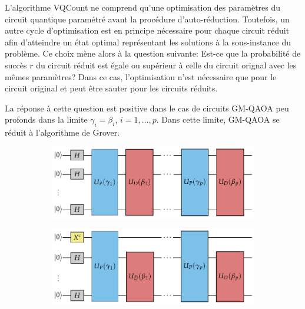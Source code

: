 L'algorithme VQCount ne comprend qu'une optimisation des paramètres du circuit quantique paramétré avant la procédure d'auto-réduction. Toutefois, un autre cycle d'optimisation est en principe nécessaire pour chaque circuit réduit afin d'atteindre un état optimal représentant les solutions à la sous-instance du problème. Ce choix mène alors à la question suivante: Est-ce que la probabilité de succès $r$ du circuit réduit est égale ou supérieur à celle du circuit orignal avec les mêmes paramètres? Dans ce cas, l'optimisation n'est nécessaire que pour le circuit original et peut être sauter pour les circuits réduits.

La réponse à cette question est positive dans le cas de circuits GM-QAOA peu profonds dans la limite $\gamma_{i}=\beta_{i}$, $i=1,\dots,p$. Dans cette limite, GM-QAOA se réduit à l'algorithme de Grover. 



\begin{figure}[t]
    \centering
    \begin{subfigure}[h]{0.45\textwidth}
    \centering
    \includegraphics[width=1\textwidth]{figures/qaoa-self-reducibility-1.pdf}
    \caption{}
    \label{fig:quantum-circuit-a}
    \end{subfigure}
    \begin{subfigure}[h]{0.45\textwidth}
    \centering
    \includegraphics[width=1\textwidth]{figures/qaoa-self-reducibility-2.pdf}
    \caption{}
    \label{fig:quantum-circuit-b}
    \end{subfigure}
\caption[Circuit VQCount]{}
\label{fig:vqcount-circuit}
\end{figure}

